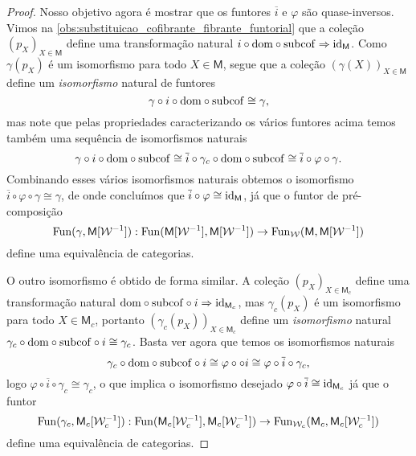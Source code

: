 \begin{proof}
  Nosso objetivo agora é mostrar que os funtores $\overline{i}$ e $\varphi$ são quase-inversos.
  Vimos na \cref{obs:substituicao_cofibrante_fibrante_funtorial} que a coleção $(p_{X})_{X \in \mathsf{M}}$ define uma transformação natural $i \circ \mathrm{dom} \circ \mathrm{subcof} \Rightarrow \mathrm{id}_{\mathsf{M}}$.
  Como $\gamma(p_{X})$ é um isomorfismo para todo $X \in \mathsf{M}$, segue que a coleção $(\gamma(X))_{X \in \mathsf{M}}$ define um \emph{isomorfismo} natural de funtores
  \begin{displaymath}
    \gamma \circ i \circ \mathrm{dom} \circ \mathrm{subcof} \cong \gamma,
  \end{displaymath}
  mas note que pelas propriedades caracterizando os vários funtores acima temos também uma sequência de isomorfismos naturais
  \begin{displaymath}
    \gamma \circ i \circ \mathrm{dom} \circ \mathrm{subcof} \cong \overline{i} \circ \gamma_{c} \circ \mathrm{dom} \circ \mathrm{subcof} \cong \overline{i} \circ \varphi \circ \gamma.
  \end{displaymath}
  Combinando esses vários isomorfismos naturais obtemos o isomorfismo $\overline{i} \circ \varphi \circ \gamma \cong \gamma$, de onde concluímos que $\overline{i} \circ \varphi \cong \mathrm{id}_{\mathsf{M}}$, já que o funtor de pré-composição
  \begin{displaymath}
    \mathrm{Fun}(\gamma,\mathsf{M}[\mathcal{W}^{-1}]): \mathrm{Fun}(\mathsf{M}[\mathcal{W}^{-1}],\mathsf{M}[\mathcal{W}^{-1}]) \to \mathrm{Fun}_{\mathcal{W}}(\mathsf{M},\mathsf{M}[\mathcal{W}^{-1}])
  \end{displaymath}
  define uma equivalência de categorias.

  O outro isomorfismo é obtido de forma similar.
  A coleção $(p_{X})_{X \in \mathsf{M}_{c}}$ define uma transformação natural $\mathrm{dom} \circ \mathrm{subcof} \circ i \Rightarrow \mathrm{id}_{\mathsf{M}_{c}}$, mas $\gamma_{c}(p_{X})$ é um isomorfismo para todo $X \in \mathsf{M}_{c}$, portanto $(\gamma_{c}(p_{X}))_{X \in \mathsf{M}_{c}}$ define um \emph{isomorfismo} natural $\gamma_{c} \circ \mathrm{dom} \circ \mathrm{subcof} \circ i \cong \gamma_{c}$.
  Basta ver agora que temos os isomorfismos naturais
  \begin{displaymath}
    \gamma_{c} \circ \mathrm{dom} \circ \mathrm{subcof} \circ i \cong \varphi \circ \circ i \cong \varphi \circ \overline{i} \circ \gamma_{c},
  \end{displaymath}
  logo $\varphi \circ \overline{i} \circ \gamma_{c} \cong \gamma_{c}$, o que implica o isomorfismo desejado $\varphi \circ \overline{i} \cong \mathrm{id}_{\mathsf{M}_{c}}$ já que o funtor
  \begin{displaymath}
    \mathrm{Fun}(\gamma_{c},\mathsf{M}_{c}[\mathcal{W}_{c}^{-1}]): \mathrm{Fun}(\mathsf{M}_{c}[\mathcal{W}_{c}^{-1}],\mathsf{M}_{c}[\mathcal{W}_{c}^{-1}]) \to \mathrm{Fun}_{\mathcal{W}_{c}}(\mathsf{M}_{c}, \mathsf{M}_{c}[\mathcal{W}_{c}^{-1}])
  \end{displaymath}
  define uma equivalência de categorias.
\end{proof}


